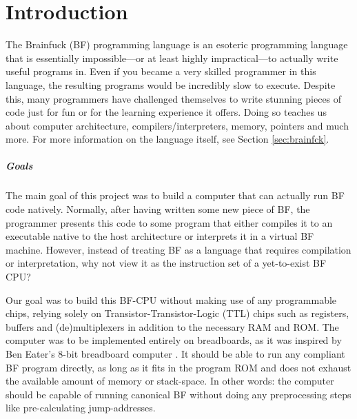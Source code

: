 \chapter{Introduction} \label{sec:introduction}
The Brainfuck (BF) programming language is an esoteric programming language that is essentially impossible---or at least highly impractical---to actually write useful programs in. Even if you became a very skilled programmer in this language, the resulting programs would be incredibly slow to execute. Despite this, many programmers have challenged themselves to write stunning pieces of code just for fun or for the learning experience it offers. Doing so teaches us about computer architecture, compilers/interpreters, memory, pointers and much more. For more information on the language itself, see Section \ref{sec:brainfck}.

\paragraph{Goals} The main goal of this project was to build a computer that can actually run BF code natively. Normally, after having written some new piece of BF, the programmer presents this code to some program that either compiles it to an executable native to the host architecture or interprets it in a virtual BF machine. However, instead of treating BF as a language that requires compilation or interpretation, why not view it as the instruction set of a yet-to-exist BF CPU?

Our goal was to build this BF-CPU without making use of any programmable chips, relying solely on Transistor-Transistor-Logic (TTL) chips such as registers, buffers and (de)multiplexers in addition to the necessary RAM and ROM. The computer was to be implemented entirely on breadboards, as it was inspired by Ben Eater's 8-bit breadboard computer \cite{beneater}. It should be able to run any compliant BF program directly, as long as it fits in the program ROM and does not exhaust the available amount of memory or stack-space. In other words: the computer should be capable of running canonical BF without doing any preprocessing steps like pre-calculating jump-addresses.

